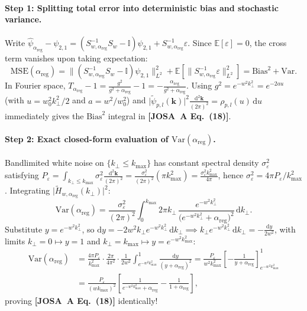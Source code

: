 \documentclass[10pt,letterpaper]{article}
\newcommand{\norm}[1]{\lVert #1 \rVert}
\newcommand{\abs}[1]{\lvert #1 \rvert}
\newcommand{\dd}{\mathrm{d}}
\newcommand{\josa}[1]{\textbf{[JOSA~A Eq.~(#1)]}}
\numberwithin{equation}{section}
\begin{document}
\paragraph*{Step 1: Splitting total error into deterministic bias and stochastic variance.}
Write $\hat{\psi}_{\alpha_{\mathrm{reg}}} - \psi_{2,1} = (S_{w,\alpha_{\mathrm{reg}}}^{-1}S_w - \mathbb{I})\psi_{2,1} + S_{w,\alpha_{\mathrm{reg}}}^{-1}\varepsilon$. Since $\mathbb{E}[\varepsilon] = 0$, the cross term vanishes upon taking expectation:
\begin{equation}
  \mathrm{MSE}(\alpha_{\mathrm{reg}}) = \norm{(S_{w,\alpha_{\mathrm{reg}}}^{-1}S_w - \mathbb{I})\psi_{2,1}}_{L^2}^2 + \mathbb{E}\!\left[\norm{S_{w,\alpha_{\mathrm{reg}}}^{-1}\varepsilon}_{L^2}^2\right] = \mathrm{Bias}^2 + \mathrm{Var}.
\end{equation}
In Fourier space, $T_{\alpha_{\mathrm{reg}}} - 1 = \frac{g^2}{g^2+\alpha_{\mathrm{reg}}} - 1 = -\frac{\alpha_{\mathrm{reg}}}{g^2+\alpha_{\mathrm{reg}}}$. Using $g^2 = e^{-w^2 k_\perp^2} = e^{-2au}$ (with $u = w_0^2 k_\perp^2/2$ and $a = w^2/w_0^2$) and $\abs{\widetilde{\psi}_{p,l}(\mathbf{k})}^2 \frac{\dd^2\mathbf{k}}{(2\pi)^2} = \rho_{p,l}(u)\,\dd u$ immediately gives the $\mathrm{Bias}^2$ integral in \josa{18}.

\paragraph*{Step 2: Exact closed-form evaluation of $\mathrm{Var}(\alpha_{\mathrm{reg}})$.}
Bandlimited white noise on $\{k_\perp \le k_{\max}\}$ has constant spectral density $\sigma_\varepsilon^2$ satisfying $P_\varepsilon = \int_{k_\perp \le k_{\max}} \sigma_\varepsilon^2 \frac{\dd^2\mathbf{k}}{(2\pi)^2} = \frac{\sigma_\varepsilon^2}{(2\pi)^2}(\pi k_{\max}^2) = \frac{\sigma_\varepsilon^2 k_{\max}^2}{4\pi}$, hence $\sigma_\varepsilon^2 = 4\pi P_\varepsilon / k_{\max}^2$. Integrating $\abs{\widetilde{H}_{w,\alpha_{\mathrm{reg}}}(k_\perp)}^2$:
\begin{equation}
  \mathrm{Var}(\alpha_{\mathrm{reg}}) = \frac{\sigma_\varepsilon^2}{(2\pi)^2}\int_0^{k_{\max}} 2\pi k_\perp\,\frac{e^{-w^2 k_\perp^2}}{\bigl(e^{-w^2 k_\perp^2} + \alpha_{\mathrm{reg}}\bigr)^2}\,\dd k_\perp.
\end{equation}
Substitute $y = e^{-w^2 k_\perp^2}$, so $\dd y = -2w^2 k_\perp e^{-w^2 k_\perp^2}\,\dd k_\perp \implies k_\perp e^{-w^2 k_\perp^2}\,\dd k_\perp = -\frac{\dd y}{2w^2}$, with limits $k_\perp = 0 \mapsto y = 1$ and $k_\perp = k_{\max} \mapsto y = e^{-w^2 k_{\max}^2}$:
\begin{align}
  \mathrm{Var}(\alpha_{\mathrm{reg}}) &= \frac{4\pi P_\varepsilon}{k_{\max}^2}\cdot\frac{2\pi}{4\pi^2}\cdot\frac{1}{2w^2}\int_{e^{-w^2 k_{\max}^2}}^{1}\frac{\dd y}{(y + \alpha_{\mathrm{reg}})^2}
  = \frac{P_\varepsilon}{w^2 k_{\max}^2}\left[-\frac{1}{y + \alpha_{\mathrm{reg}}}\right]_{e^{-w^2 k_{\max}^2}}^{1} \nonumber \\
  &= \frac{P_\varepsilon}{(w k_{\max})^2}\left[\frac{1}{e^{-w^2 k_{\max}^2} + \alpha_{\mathrm{reg}}} - \frac{1}{1 + \alpha_{\mathrm{reg}}}\right],
\end{align}
proving \josa{18} identically!
\end{document}
